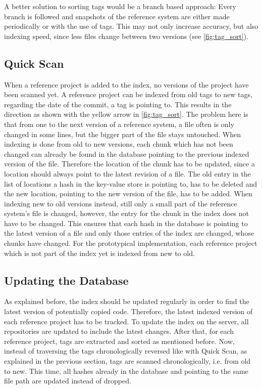 A better solution to sorting tags would be a branch based approach:
Every branch is followed and snapshots of the reference system are either made periodically or with the use of tags.
This may not only increase accuracy, but also indexing speed, since less files change between two versions (see \autoref{fig:tag_sort}).

\subsection{Quick Scan}\label{section:implementation/history_analysis/quick_scan}
When a reference project is added to the index, no versions of the project have been scanned yet.
A reference project can be indexed from old tags to new tags, regarding the date of the commit, a tag is pointing to.
This results in the direction as shown with the yellow arrow in \autoref{fig:tag_sort}.
The problem here is that from one to the next version of a reference system, a file often is only changed in some lines, but the bigger part of the file stays untouched.
When indexing is done from old to new versions, each chunk which has not been changed can already be found in the database pointing to the previous indexed version of the file.
Therefore the location of the chunk has to be updated, since a location should always point to the latest revision of a file.
The old entry in the list of locations a hash in the key-value store is pointing to, has to be deleted and the new location, pointing to the new version of the file, has to be added.
When indexing new to old versions instead, still only a small part of the reference system's file is changed, however, the entry for the chunk in the index does not have to be changed.
This ensures that each hash in the database is pointing to the latest version of a file and only those entries of the index are changed, whose chunks have changed.
For the prototypical implementation, each reference project which is not part of the index yet is indexed from new to old.

\subsection{Updating the Database}\label{section:implementation/history_analysis/update}
As explained before, the index should be updated regularly in order to find the latest version of potentially copied code.
Therefore, the latest indexed version of each reference project has to be tracked.
To update the index on the server, all repositories are updated to include the latest changes.
After that, for each reference project, tags are extracted and sorted as mentioned before.
Now, instead of traversing the tags chronologically reversed like with Quick Scan, as explained in the previous section, tags are scanned chronologically, i.e. from old to new.
This time, all hashes already in the database and pointing to the same file path are updated instead of dropped.

